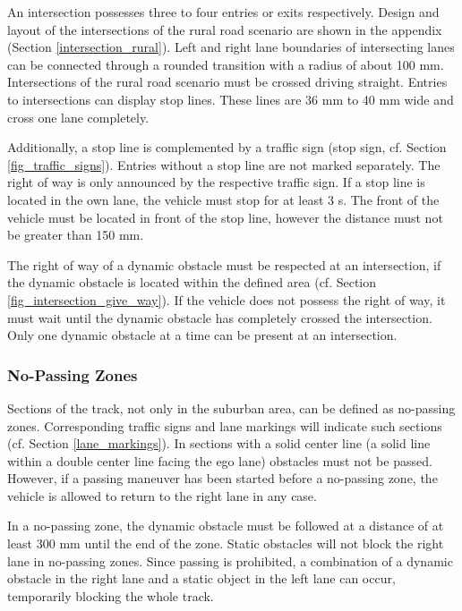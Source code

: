 An intersection possesses three to four entries or exits respectively. Design
and layout of the intersections of the rural road scenario are shown in the
appendix (Section \ref{intersection_rural}). Left and right lane boundaries of
intersecting lanes can be connected through a rounded transition with a radius
of about 100 mm. Intersections of the rural road scenario must be crossed
driving straight. Entries to intersections can display stop lines. These lines
are 36 mm to 40 mm wide and cross one lane completely.

Additionally, a stop line is complemented by a traffic sign (stop sign, cf.
Section \ref{fig_traffic_signs}). Entries without a stop line are not marked
separately. The right of way is only announced by the respective traffic sign.
If a stop line is located in the own lane, the vehicle must stop for at least 3
s. The front of the vehicle must be located in front of the stop line, however
the distance must not be greater than 150 mm.

The right of way of a dynamic obstacle must be respected at an intersection, if
the dynamic obstacle is located within the defined area (cf. Section
\ref{fig_intersection_give_way}). If the vehicle does not possess the right of
way, it must wait until the dynamic obstacle has completely crossed the
intersection. Only one dynamic obstacle at a time can be present at an
intersection.

\subsubsection{No-Passing Zones}
\label{no_passing_zones}

Sections of the track, not only in the suburban area, can be defined as
no-passing zones. Corresponding traffic signs and lane markings will indicate
such sections (cf. Section \ref{lane_markings}). In sections with a solid
center line (a solid line within a double center line facing the ego lane)
obstacles must not be passed. However, if a passing maneuver has been started
before a no-passing zone, the vehicle is allowed to return to the right lane in
any case.

In a no-passing zone, the dynamic obstacle must be followed at a distance of at
least 300 mm until the end of the zone. Static obstacles will not block the
right lane in no-passing zones. Since passing is prohibited, a combination of a
dynamic obstacle in the right lane and a static object in the left lane can
occur, temporarily blocking the whole track.

